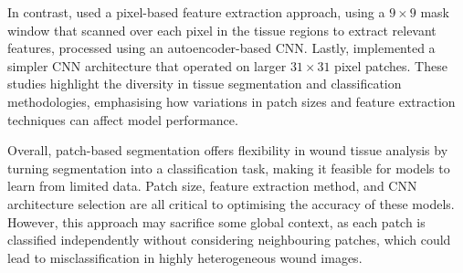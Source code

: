 In contrast, \citet{RW44maity2018pixel} used a pixel-based feature extraction approach, using a $9 \times 9$ mask window that scanned over each pixel in the tissue regions to extract relevant features, processed using an autoencoder-based CNN. Lastly, \citet{RW43pholberdee2018study} implemented a simpler CNN architecture that operated on larger $31 \times 31$ pixel patches. These studies highlight the diversity in tissue segmentation and classification methodologies, emphasising how variations in patch sizes and feature extraction techniques can affect model performance.

Overall, patch-based segmentation offers flexibility in wound tissue analysis by turning segmentation into a classification task, making it feasible for models to learn from limited data. Patch size, feature extraction method, and CNN architecture selection are all critical to optimising the accuracy of these models. However, this approach may sacrifice some global context, as each patch is classified independently without considering neighbouring patches, which could lead to misclassification in highly heterogeneous wound images.



